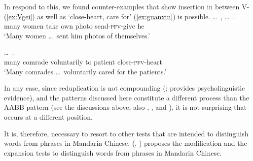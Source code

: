 \z\z

In respond to this, we found counter-examples that show  insertion in between V- (\ref{ex:Vgei}) as well as  `close-heart, care for' (\ref{ex:guanxin}) is possible.
\ea\label{ex:Vgei}%
\gll \ldots\,  ,    \ldots\,  .\\
{} many women take own photo {} send-\textsc{pfv}-give he\\
\glt `Many women \ldots\, sent him photos of themselves.'
\z

\ea\label{ex:guanxin}%
\gll {}  \ldots\,    .\\
many comrade {} voluntarily to patient close-\textsc{pfv}-heart\\
\glt `Many comrades \ldots\, voluntarily cared for the patients.'
\z

In any case, since reduplication is not compounding (\citealt[149--150]{Sui2018}; \citealt{GaoEtAl2021} provides psycholinguistic evidence),
and the patterns discussed here constitute a different process than the AABB pattern
(see the discussions above, also \citealt[Sec. 4.3]{Deng2013}, \citealt[Sec. 2]{SuiHu2016}, \citealt{Sui2018} and \citealt{Wang2023}),
it is not surprising that  occurs at a different position.

It is, therefore, necessary to resort to other tests that are intended to distinguish words from phrases in Mandarin Chinese. 
 \citeauthor{Dai1992} (\citeyear[32--33]{Dai1992}, \citeyear[117--120]{Dai1998}) proposes the modification and the expansion tests to distinguish words from phrases in Mandarin Chinese.

